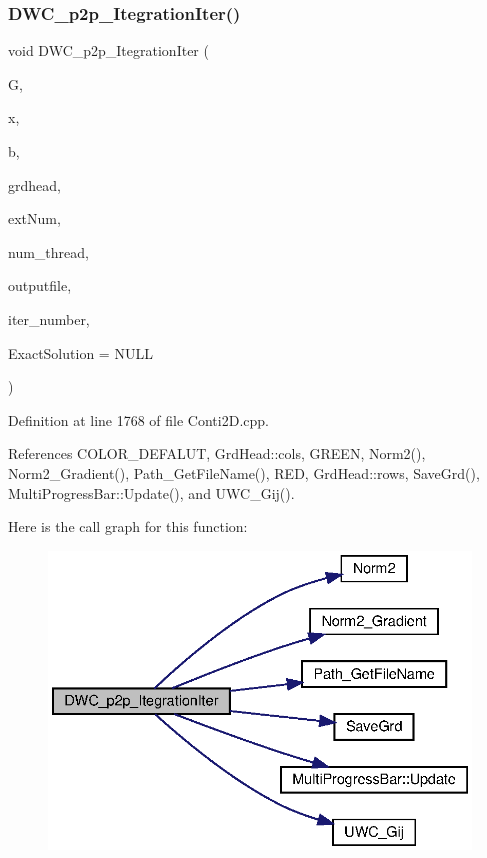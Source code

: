\subsubsection{D\+W\+C\+\_\+p2p\+\_\+\+Itegration\+Iter()}
{\footnotesize\ttfamily void D\+W\+C\+\_\+p2p\+\_\+\+Itegration\+Iter (\begin{DoxyParamCaption}\item[{double $\ast$}]{G,  }\item[{double $\ast$}]{x,  }\item[{double $\ast$}]{b,  }\item[{\textbf{ Grd\+Head}}]{grdhead,  }\item[{int}]{ext\+Num,  }\item[{int}]{num\+\_\+thread,  }\item[{string}]{outputfile,  }\item[{double}]{iter\+\_\+number,  }\item[{double $\ast$}]{Exact\+Solution = {\ttfamily NULL} }\end{DoxyParamCaption})}



Definition at line 1768 of file Conti2\+D.\+cpp.



References C\+O\+L\+O\+R\+\_\+\+D\+E\+F\+A\+L\+UT, Grd\+Head\+::cols, G\+R\+E\+EN, Norm2(), Norm2\+\_\+\+Gradient(), Path\+\_\+\+Get\+File\+Name(), R\+ED, Grd\+Head\+::rows, Save\+Grd(), Multi\+Progress\+Bar\+::\+Update(), and U\+W\+C\+\_\+\+Gij().

Here is the call graph for this function\+:
\nopagebreak
\begin{figure}[H]
\begin{center}
\leavevmode
\includegraphics[width=334pt]{Conti2D_8h_a1bb3d1115c283e9063a98ee17fa9d31f_a1bb3d1115c283e9063a98ee17fa9d31f_cgraph}
\end{center}
\end{figure}
\mbox{\label{Conti2D_8h_a8affb7fb2246ce1c959f681fc7baaa05_a8affb7fb2246ce1c959f681fc7baaa05}} 
